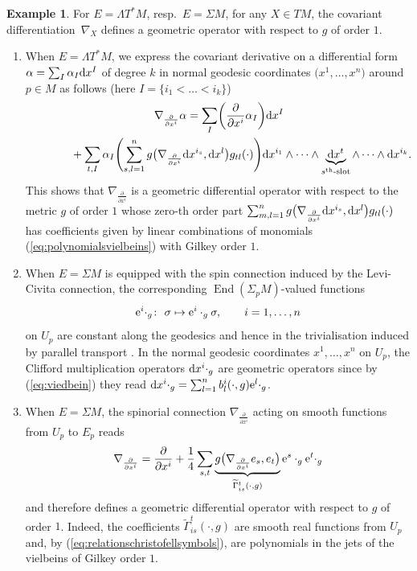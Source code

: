 \documentclass[10pt,a4paper]{amsart}
\numberwithin{equation}{section}
\theoremstyle{definition}
\newtheorem{ex}[thm]{Example}
\begin{document}
 \begin{ex}\label{ex:nablaXdiffgeom}
 For $E=\Lambda T^*M$, resp.\ $E=\Sigma M$, for any $X\in TM$,
 the covariant differentiation~$\nabla_X$ defines a geometric operator with respect to $g$ of order $1$.
 \begin{enumerate}\itemsep=0pt
\item When $E=\Lambda T^*M$, we express the covariant derivative on a differential form $\alpha=\sum_{I}\alpha_{I} {\rm d}x^I$ of degree $k$ in normal geodesic coordinates $\bigl(x^1, \dots, x^n\bigr)$ around $p\in M$ as follows (here $I=\{i_1<\dots<i_k\}$)
 	\begin{gather*}
 	 	\nabla_{\frac{\partial}{\partial x^i}}\alpha
= \sum_{I}\biggl({\frac{\partial}{\partial x^i}}\alpha_{I}\biggr) {\rm d}x^I\\
\hphantom{\nabla_{\frac{\partial}{\partial x^i}}\alpha =}{}
 + \sum_{t,I}\alpha_{I}\Biggl(\sum_{s,l=1}^n g\bigl(\nabla_{\frac{\partial}{\partial x^i}} {\rm d}x^{i_s},{\rm d}x^l\bigr)g_{tl}(\cdot)\Biggr) {\rm d}x^{i_1}\wedge\dots\wedge \underbrace{{\rm d}x^t}_{s^{\rm th}\text{{\rm -slot}}}\wedge\dots\wedge {\rm d}x^{i_k}.
 	\end{gather*}
This shows that $\nabla_{\frac{\partial}{\partial x^i}}$ is a geometric differential operator with respect to the metric $g$ of order $1$ whose zero-th order part $\sum_{m,l=1}^n g\bigl(\nabla_{\frac{\partial}{\partial x^i}} {\rm d}x^{i_s},{\rm d}x^l\bigr)g_{tl}(\cdot)$ has coefficients given by linear combinations of monomials (\ref{eq:polynomialsvielbeins}) with Gilkey order $1$.
 \item When $E=\Sigma M$ is equipped with the spin connection induced by the Levi-Civita connection, the corresponding $\operatorname{End}(\Sigma_p M)$-valued functions
\[{\rm e}^i \cdot_g\colon \ \sigma \mapsto {\rm e}^i \cdot_g \sigma,\qquad i=1, \dots, n\]
on $U_p$ are constant along the geodesics and hence in the trivialisation induced by parallel transport \cite[Lemma 4.14]{BGV}. In the normal geodesic coordinates $x^1, \dots, x^n$ on $U_p$, the Clifford multiplication operators ${\rm d}x^i \cdot_g$ are geometric operators since by (\ref{eq:viedbein}) they read
 $ {\rm d}x^i 	\cdot_g =\sum_{l=1}^n b_l^i(\cdot, g) {\rm e}^l \cdot_g $.

\item When $E=\Sigma M$, the spinorial connection $\nabla_{\frac{\partial}{\partial x^i}}$ acting on smooth functions from $U_p$ to $E_p$ reads
\begin{equation}\label{eq:connspin}
\nabla_{\frac{\partial}{\partial x^i}} =\frac{\partial}{\partial x^i} +\frac{1}{4}\sum_{s,t}\underbrace{g\bigl(\nabla_{\frac{\partial}{\partial x^i}} e_s,e_t\bigr)}_{\widetilde\Gamma_{i s }^t(\cdot,g)} {\rm e}^s\cdot_g {\rm e}^t\cdot_g
\end{equation}
and therefore defines a geometric differential operator with respect to $g$ of order $1$. Indeed, the coefficients $\widetilde\Gamma_{i s}^t(\cdot,g)$ are smooth real functions from $U_p$ and, by (\ref{eq:relationschristofellsymbols}), are polynomials in the jets of the vielbeins of Gilkey order $1$.
\end{enumerate}
\end{ex}
\end{document}
